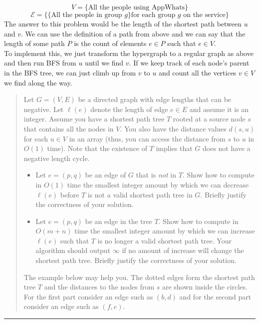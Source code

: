 \documentclass[11pt]{article}
\begin{document}
\begin{solution}
\begin{itemize}
            \[
                V = \{\text{All the people using AppWhats}\}
            \]
            \[
                \mathcal{E} = \{\{\text{All the people in group $g$}\} \text{for each group $g$ on the service}\}
            \]
            The answer to this problem would be the length of the shortest path between $u$ and $v$. We can use the definition of a path from above and we can say that the length of some path $P$ is the count of elements $e \in P$ such that $e \in V$.
            \\ To implement this, we just transform the hypergraph to a regular graph as above and then run BFS from $u$ until we find $v$. If we keep track of each node's parent in the BFS tree, we can just climb up from $v$ to $u$ and count all the vertices $v \in V$ we find along the way. 
    \end{itemize}
\end{solution}


\begin{quote}
Let $G=(V,E)$ be a directed graph with edge lengths that can be
  negative. Let $\ell(e)$ denote the length of edge $e \in E$ and
  assume it is an integer. Assume you have a shortest path tree $T$
  rooted at a source node $s$ that contains all the nodes in $V$. You
  also have the distance values $d(s,u)$ for each $u \in V$ in an
  array (thus, you can access the distance from $s$ to $u$ in $O(1)$
  time). Note that the existence of $T$ implies that $G$ does not have
  a negative length cycle. 
  \begin{itemize}
  \item  Let $e=(p,q)$ be an edge of $G$ that is {\em not} in
    $T$. Show how to compute in $O(1)$ time the smallest
    integer amount by which we can decrease $\ell(e)$ before $T$
    is not a valid shortest path tree in $G$. Briefly justify the correctness of your solution.
  \item Let $e=(p,q)$ be an edge in the tree $T$. Show how to
  compute in $O(m+n)$ time the smallest integer amount by which we can 
  increase $\ell(e)$ such that $T$ is no longer a valid shortest path tree. 
  Your algorithm should output $\infty$ if no amount of increase will
  change the shortest path tree. Briefly justify the correctness of your solution.
  \end{itemize}
  The example below may help you. The dotted 
 edges form the shortest path tree $T$ and the distances to the nodes
  from $s$ are shown inside the circles. For the first part consider
  an edge such as $(b,d)$ and for the second part consider an edge
  such as $(f,e)$.
\end{quote}
\hrule
\end{document}
